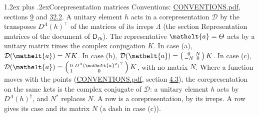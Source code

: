 \documentclass[10pt,a4paper]{article}
\makeatletter
\renewcommand\section{\@startsection{section}{1}{\z@}{-3ex plus -1ex minus -.2ex}%
  {1.2ex plus .2ex}{\normalfont\large\sffamily\bfseries\color{parttitle}}}
\numberwithin{equation}{section}
\newcommand{\eltfont}[1]{{\let\sigma\eltsigma\mathelt{#1}}}
\newcommand{\grp}[1]{\mathsf{#1}}
\newcommand{\elt}[1]{\eltfont{#1}}
\makeatother
\begin{document}
\section{Corepresentation matrices}\label{s:corep_matrices}
Conventions: \href{../../CONVENTIONS.pdf}{CONVENTIONS.pdf}, sections \href{../../../rotation/CONVENTIONS.pdf\#conv.9}{9} and \href{../../CONVENTIONS.pdf\#conv.32.2}{32.2}.
A unitary element $h$ acts in a corepresentation $\mathcal{D}$ by the transposes $D^{\Lambda}(h)^{\top}$ of the matrices of its irreps $\Lambda$ (the section Representation matrices of the document of \href{../../../rotation/data/pdf/D7h.pdf}{$\grp{D_{7h}}$}). The representative $\elt{a} = \varTheta$ acts by a unitary matrix times the complex conjugation $K$.
In case (a), $\mathcal{D}(\elt{a}) = NK$. In case (b), $\mathcal{D}(\elt{a}) = \left(\begin{smallmatrix} 0 & N \\ -N & 0 \end{smallmatrix}\right) K$. In case (c), $\mathcal{D}(\elt{a}) = \left(\begin{smallmatrix} 0 & D^{\Lambda}(\elt{a}^2)^{\top} \\ 1 & 0 \end{smallmatrix}\right) K$, with no matrix $N$.
Where a function moves with the points (\href{../../CONVENTIONS.pdf}{CONVENTIONS.pdf}, section \href{../../../rotation/CONVENTIONS.pdf\#conv.4.3}{4.3}), the corepresentation on the same kets is the complex conjugate of $\mathcal{D}$: a unitary element $h$ acts by $D^{\Lambda}(h)^{\dagger}$, and $N^{*}$ replaces $N$.
A row is a corepresentation, by its irreps. A row gives its case and its matrix $N$ (a dash in case (c)).
\end{document}
